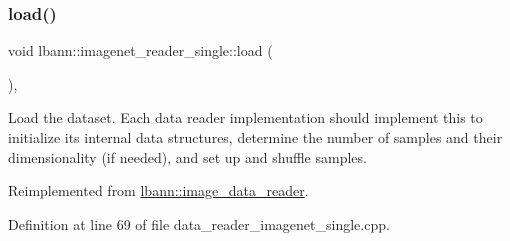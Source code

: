 \subsubsection{\texorpdfstring{load()}{load()}}
{\footnotesize\ttfamily void lbann\+::imagenet\+\_\+reader\+\_\+single\+::load (\begin{DoxyParamCaption}{ }\end{DoxyParamCaption})\hspace{0.3cm}{\ttfamily [override]}, {\ttfamily [virtual]}}

Load the dataset. Each data reader implementation should implement this to initialize its internal data structures, determine the number of samples and their dimensionality (if needed), and set up and shuffle samples. 

Reimplemented from \hyperlink{classlbann_1_1image__data__reader_a99cb80242d7d20bc1e8baeaff25ff790}{lbann\+::image\+\_\+data\+\_\+reader}.



Definition at line 69 of file data\+\_\+reader\+\_\+imagenet\+\_\+single.\+cpp.


